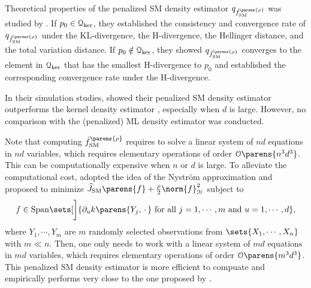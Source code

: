 Theoretical properties of the penalized SM density estimator $q_{\hat{f}_{\SM}^{\parens{\rho}}}$ was studied by \textcites{Sriperumbudur-density-estimation-inf-exp-family}. If $p_0 \in \mathcal{Q}_{\ker}$, they established the consistency and convergence rate of $q_{\hat{f}_{\SM}^{\parens{\rho}}}$ under the KL-divergence, the H-divergence, the Hellinger distance, and the total variation distance. 
If $p_0 \notin \mathcal{Q}_{\ker}$, they showed $q_{\hat{f}_{\SM}^{\parens{\rho}}}$ converges to the element in $\mathcal{Q}_{\ker}$ that has the smallest H-divergence to $p_0$ and established the corresponding convergence rate under the H-divergence. 

In their simulation studies, \textcite{Sriperumbudur-density-estimation-inf-exp-family} showed their penalized SM density estimator outperforms the kernel density estimator \parencites[Section 6.3 in][]{Wasserman2006-lj}, especially when $d$ is large. However, no comparison with the (penalized) ML density estimator was conducted. 

Note that computing $\hat{f}_{\SM}^{\parens{\rho}}$ requires to solve a linear system of $nd$ equations in $nd$ variables, which requires elementary operations of order $\calO \parens{n^3 d^3}$. This can be computationally expensive when $n$ or $d$ is large. To alleviate the computational cost, \textcite{Sutherland2017-wz} adopted the idea of the Nystr{\"o}m approximation \parencite{Williams2001-ka} and proposed to minimize $\widehat{J}_{\SM} \parens{f} + \frac{\rho}{2} \norm{f}_{\calH}^2$ subject to 
\begin{align*}
	f \in \mathrm{Span} \sets[\bigg]{\partial_u k \parens{Y_j, \,\cdot\,} \text{ for all } j = 1, \cdots, m \text{ and } u = 1, \cdots, d}, 
\end{align*}
where 
$Y_1, \cdots, Y_m$ are $m$ randomly selected observations from $\sets{X_1, \cdots, X_n}$ with $m \ll n$. Then, one only needs to work with a linear system of $md$ equations in $md$ variables, which requires elementary operations of order $\calO \parens{m^3 d^3}$. This penalized SM density estimator is more efficient to compuate and empirically performs very close to the one proposed by \textcite{Sriperumbudur-density-estimation-inf-exp-family}. 

